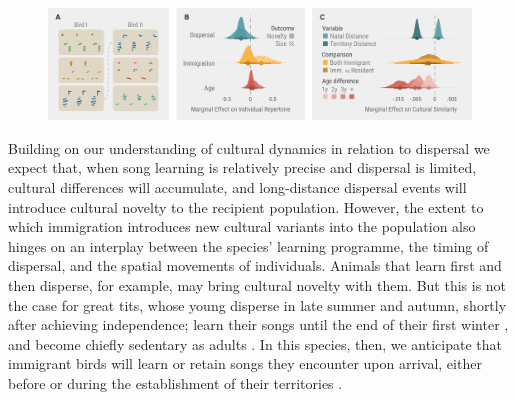 \documentclass[9pt, twocolumn, twoside]{gsajnl}
\begin{document}
\begin{figure}[!t]
    \centering
    \includegraphics[width=\linewidth]{figures/chapter_4/FIG2.pdf}
    \label{c4_fig:individual}
\end{figure}

Building on our understanding of cultural dynamics in relation to dispersal we expect that, when song learning is relatively precise and dispersal is limited, cultural differences will accumulate, and long-distance dispersal events will introduce cultural novelty to the recipient population. However, the extent to which immigration introduces new cultural variants into the population also hinges on an interplay between the species' learning programme, the timing of dispersal, and the spatial movements of individuals. Animals that learn first and then disperse, for example, may bring cultural novelty with them. But this is not the case for great tits, whose young disperse in late summer and autumn, shortly after achieving independence; learn their songs until the end of their first winter \parencite{rivera-gutierrez2011}, and become chiefly sedentary as adults \parencite{greenwood1979, dhondt1979, dingemanse2003}. In this species, then, we anticipate that immigrant birds will learn or retain songs they encounter upon arrival, either before or during the establishment of their territories \parencite{keen2020, graham2018}. 
\end{document}
